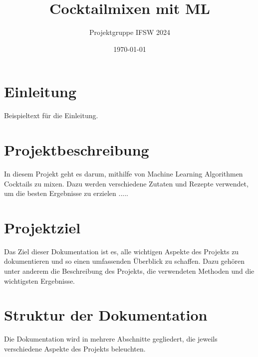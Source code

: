 \documentclass{article}
\title{Cocktailmixen mit ML}
\author{Projektgruppe IFSW 2024}
\date{\today}
\begin{document}
\maketitle

\section*{Einleitung}

Beispieltext für die Einleitung.

\section{Projektbeschreibung}

In diesem Projekt geht es darum, mithilfe von Machine Learning Algorithmen Cocktails zu mixen. Dazu werden verschiedene Zutaten und Rezepte verwendet, um die besten Ergebnisse zu erzielen .....
\section{Projektziel}

Das Ziel dieser Dokumentation ist es, alle wichtigen Aspekte des Projekts zu dokumentieren und so einen umfassenden Überblick zu schaffen. Dazu gehören unter anderem die Beschreibung des Projekts, die verwendeten Methoden und die wichtigsten Ergebnisse.

\section{Struktur der Dokumentation}

Die Dokumentation wird in mehrere Abschnitte gegliedert, die jeweils verschiedene Aspekte des Projekts beleuchten. 
\end{document}
